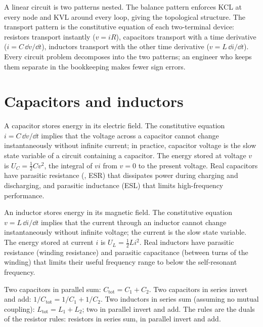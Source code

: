 \begin{archetype}
A linear circuit is two patterns nested. The balance pattern enforces
KCL at every node and KVL around every loop, giving the topological
structure. The transport pattern is the constitutive equation of each
two-terminal device: resistors transport instantly ($v = iR$),
capacitors transport with a time derivative ($i = C\,\dd v/\dd t$),
inductors transport with the other time derivative ($v = L\,\dd i/
\dd t$). Every circuit problem decomposes into the two patterns; an
engineer who keeps them separate in the bookkeeping makes fewer sign
errors.
\end{archetype}

\section{Capacitors and inductors}

A capacitor stores energy in its electric field. The constitutive
equation $i = C\,\dd v/\dd t$ implies that the voltage across a
capacitor cannot change instantaneously without infinite current; in
practice, capacitor voltage is the slow state variable of a circuit
containing a capacitor. The energy stored at voltage $v$ is
$U_{C} = \tfrac{1}{2}Cv^{2}$, the integral of $vi$ from $v = 0$ to the
present voltage. Real capacitors have parasitic resistance
(, ESR) that dissipates power
during charging and discharging, and parasitic inductance (ESL) that
limits high-frequency performance.

An inductor stores energy in its magnetic field. The constitutive
equation $v = L\,\dd i/\dd t$ implies that the current through an
inductor cannot change instantaneously without infinite voltage; the
current is the slow state variable. The energy stored at current $i$
is $U_{L} = \tfrac{1}{2}Li^{2}$. Real inductors have parasitic
resistance (winding resistance) and parasitic capacitance (between
turns of the winding) that limits their useful frequency range to
below the self-resonant frequency.

Two capacitors in parallel sum: $C_{\text{tot}} = C_{1}+C_{2}$. Two
capacitors in series invert and add: $1/C_{\text{tot}} = 1/C_{1} +
1/C_{2}$. Two inductors in series sum (assuming no mutual coupling):
$L_{\text{tot}} = L_{1}+L_{2}$; two in parallel invert and add. The
rules are the duals of the resistor rules: resistors in series sum,
in parallel invert and add.

